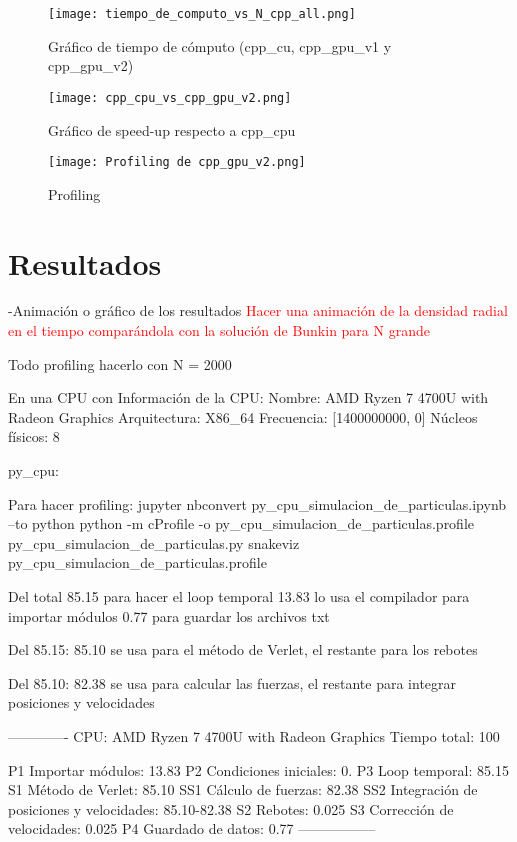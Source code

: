 \documentclass[aps,prb,twocolumn,superscriptaddress,floatfix,longbibliography]{revtex4-2}
\newcounter{para}
\begin{document}
\begin{itemize}
\begin{figure}[h]
    \texttt{[image: tiempo\_de\_computo\_vs\_N\_cpp\_all.png]}
    \caption{Gráfico de tiempo de cómputo (cpp_cu, cpp_gpu_v1 y cpp_gpu_v2)}
     \label{fig:tiempo_de_computo_vs_N_cpp_all}
\end{figure}

\begin{figure}[h]
    \texttt{[image: cpp\_cpu\_vs\_cpp\_gpu\_v2.png]}
    \caption{Gráfico de speed-up respecto a cpp_cpu}
     \label{fig:cpp_cpu_vs_cpp_gpu_v2}
\end{figure}

\begin{figure}[h]
    \texttt{[image: Profiling de cpp\_gpu\_v2.png]}
    \caption{Profiling}
     \label{fig:Profiling de cpp_gpu_v2}
\end{figure}

\section{Resultados}

-Animación o gráfico de los resultados
\textcolor{red}{Hacer una animación de la densidad radial en el tiempo comparándola con la solución de Bunkin para N grande}



Todo profiling hacerlo con N = 2000

En una CPU con
Información de la CPU:
Nombre: AMD Ryzen 7 4700U with Radeon Graphics
Arquitectura: X86_64
Frecuencia: [1400000000, 0]
Núcleos físicos: 8

py_cpu:

Para hacer profiling:
jupyter nbconvert py_cpu_simulacion_de_particulas.ipynb --to python
python -m cProfile -o py_cpu_simulacion_de_particulas.profile py_cpu_simulacion_de_particulas.py
snakeviz py_cpu_simulacion_de_particulas.profile

Del total
85.15 para hacer el loop temporal
13.83 lo usa el compilador para importar módulos
0.77 para guardar los archivos txt

Del 85.15:
85.10 se usa para el método de Verlet, el restante para los rebotes

Del 85.10:
82.38 se usa para calcular las fuerzas, el restante para integrar posiciones y velocidades

-------------
CPU: AMD Ryzen 7 4700U with Radeon Graphics
Tiempo total: 100

P1 Importar módulos: 13.83
P2 Condiciones iniciales: 0.
P3 Loop temporal: 85.15
S1 Método de Verlet: 85.10
SS1 Cálculo de fuerzas: 82.38
SS2 Integración de posiciones y velocidades: 85.10-82.38
S2 Rebotes: 0.025
S3 Corrección de velocidades: 0.025
P4 Guardado de datos: 0.77
-----------------





\end{itemize}
\end{document}
